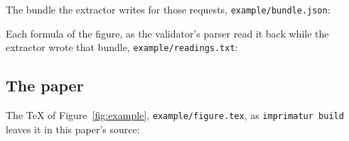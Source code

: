 \documentclass[acmsmall,screen,review,anonymous,nonacm]{acmart}
\begin{document}
The bundle the extractor writes for those requests,
\texttt{example/bundle.json}:

\noindent Each formula of the figure, as the validator's parser read it
back while the extractor wrote that bundle, \texttt{example/readings.txt}:

\subsection{The paper}

The \TeX{} of Figure~\ref{fig:example}, \texttt{example/figure.tex}, as
\texttt{imprimatur build} leaves it in this paper's source:
\end{document}

